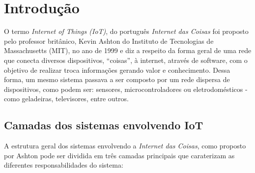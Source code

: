 \documentclass[12pt, a4paper]{article}
\begin{document}
\capa
\tableofcontents
\cleardoublepage
\listoffigures
\cleardoublepage
\listoftables
\cleardoublepage



\section{Introdução}

O termo \textit{Internet of Things (IoT)}, do português \textit{Internet das Coisas} foi proposto pelo professor britânico, Kevin Ashton do Instituto de Tecnologias de Massachusetts (MIT), no ano de 1999\cite{5} e diz a respeito da forma geral de uma rede que conecta diversos dispositivos, ``coisas'', à internet, através de software, com o objetivo de realizar troca informações\cite{defIot} gerando valor e conhecimento. Dessa forma, um mesmo sistema passava a ser composto por um rede dispersa de dispositivos, como podem ser: sensores, microcontroladores ou eletrodomésticos - como geladeiras, televisores, entre outros.

\subsection*{Camadas dos sistemas envolvendo IoT}\label{Camadas dos sistemas de IoT}

A estrutura geral dos sistemas envolvendo a \textit{Internet das Coisas}, como proposto por Ashton pode ser dividida em três camadas principais\cite{5} que caraterizam as diferentes responsabilidades do sistema:
\end{document}
